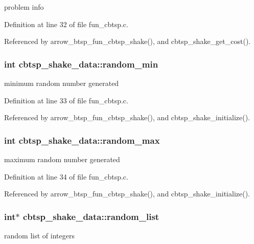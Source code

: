 problem info 

Definition at line 32 of file fun\_\-cbtsp.c.

Referenced by arrow\_\-btsp\_\-fun\_\-cbtsp\_\-shake(), and cbtsp\_\-shake\_\-get\_\-cost().\hypertarget{structcbtsp__shake__data_88e2f84442dd2fb0cfdf548de45dd4a2}{
\subsubsection{\setlength{\rightskip}{0pt plus 5cm}int {\bf cbtsp\_\-shake\_\-data::random\_\-min}}}
\label{structcbtsp__shake__data_88e2f84442dd2fb0cfdf548de45dd4a2}


minimum random number generated 

Definition at line 33 of file fun\_\-cbtsp.c.

Referenced by arrow\_\-btsp\_\-fun\_\-cbtsp\_\-shake(), and cbtsp\_\-shake\_\-initialize().\hypertarget{structcbtsp__shake__data_c60975938eff642adfafd228b666d536}{
\subsubsection{\setlength{\rightskip}{0pt plus 5cm}int {\bf cbtsp\_\-shake\_\-data::random\_\-max}}}
\label{structcbtsp__shake__data_c60975938eff642adfafd228b666d536}


maximum random number generated 

Definition at line 34 of file fun\_\-cbtsp.c.

Referenced by arrow\_\-btsp\_\-fun\_\-cbtsp\_\-shake(), and cbtsp\_\-shake\_\-initialize().\hypertarget{structcbtsp__shake__data_325d0115e7fe18f7fede7e164e6f6d8f}{
\subsubsection{\setlength{\rightskip}{0pt plus 5cm}int$\ast$ {\bf cbtsp\_\-shake\_\-data::random\_\-list}}}
\label{structcbtsp__shake__data_325d0115e7fe18f7fede7e164e6f6d8f}


random list of integers 


